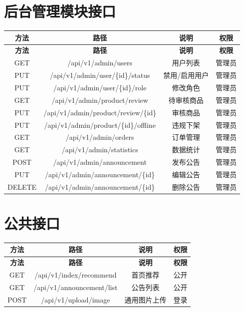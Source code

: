\documentclass[12pt,a4paper,UTF8]{ctexart}
\begin{document}
\section{后台管理模块接口}

\begin{longtable}{|c|c|c|c|}
    \hline
    \textbf{方法} & \textbf{路径} & \textbf{说明} & \textbf{权限} \\
    \hline
    \endfirsthead
    \hline
    \textbf{方法} & \textbf{路径} & \textbf{说明} & \textbf{权限} \\
    \hline
    \endhead
    \hline
    \endfoot

    GET & /api/v1/admin/users & 用户列表 & 管理员 \\
    \hline
    PUT & /api/v1/admin/user/\{id\}/status & 禁用/启用用户 & 管理员 \\
    \hline
    PUT & /api/v1/admin/user/\{id\}/role & 修改角色 & 管理员 \\
    \hline
    GET & /api/v1/admin/product/review & 待审核商品 & 管理员 \\
    \hline
    PUT & /api/v1/admin/product/review/\{id\} & 审核商品 & 管理员 \\
    \hline
    PUT & /api/v1/admin/product/\{id\}/offline & 违规下架 & 管理员 \\
    \hline
    GET & /api/v1/admin/orders & 订单管理 & 管理员 \\
    \hline
    GET & /api/v1/admin/statistics & 数据统计 & 管理员 \\
    \hline
    POST & /api/v1/admin/announcement & 发布公告 & 管理员 \\
    \hline
    PUT & /api/v1/admin/announcement/\{id\} & 编辑公告 & 管理员 \\
    \hline
    DELETE & /api/v1/admin/announcement/\{id\} & 删除公告 & 管理员 \\
    \hline
\end{longtable}

\section{公共接口}

\begin{longtable}{|c|c|c|c|}
    \hline
    \textbf{方法} & \textbf{路径} & \textbf{说明} & \textbf{权限} \\
    \hline
    \endfirsthead
    \hline
    \textbf{方法} & \textbf{路径} & \textbf{说明} & \textbf{权限} \\
    \hline
    \endhead
    \hline
    \endfoot

    GET & /api/v1/index/recommend & 首页推荐 & 公开 \\
    \hline
    GET & /api/v1/announcement/list & 公告列表 & 公开 \\
    \hline
    POST & /api/v1/upload/image & 通用图片上传 & 登录 \\
    \hline
\end{longtable}
\end{document}
